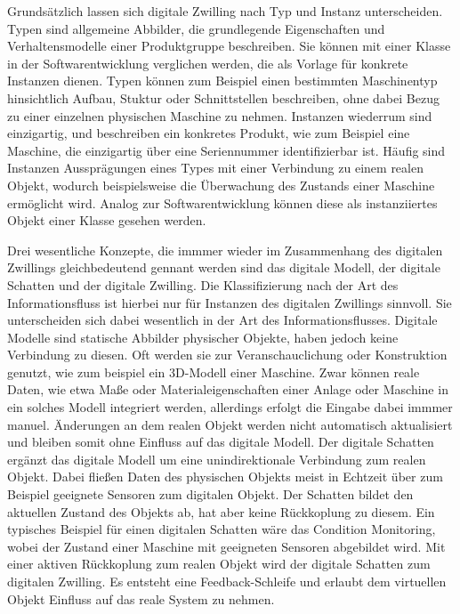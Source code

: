 Grundsätzlich lassen sich digitale Zwilling nach Typ und Instanz unterscheiden.
Typen sind allgemeine Abbilder, die grundlegende Eigenschaften und Verhaltensmodelle einer Produktgruppe beschreiben. 
Sie können mit einer Klasse in der Softwarentwicklung verglichen werden, die als Vorlage für konkrete Instanzen dienen.
Typen können zum Beispiel einen bestimmten Maschinentyp hinsichtlich Aufbau, Stuktur oder Schnittstellen beschreiben, ohne dabei Bezug zu einer einzelnen physischen Maschine zu nehmen.
Instanzen wiederrum sind einzigartig, und beschreiben ein konkretes Produkt, wie zum Beispiel eine Maschine, die einzigartig über eine Seriennummer identifizierbar ist.
Häufig sind Instanzen Aussprägungen eines Types mit einer Verbindung zu einem realen Objekt, wodurch beispielsweise die Überwachung des Zustands einer Maschine ermöglicht wird.
Analog zur Softwarentwicklung können diese als instanziiertes Objekt einer Klasse gesehen werden. \cite{ZEISS}

Drei wesentliche Konzepte, die immmer wieder im Zusammenhang des digitalen Zwillings gleichbedeutend gennant werden sind das digitale Modell, der digitale Schatten und der digitale Zwilling. \cite{KRITZINGER20181016}
Die Klassifizierung nach der Art des Informationsfluss ist hierbei nur für Instanzen des digitalen Zwillings sinnvoll.
Sie unterscheiden sich dabei wesentlich in der Art des Informationsflusses.
Digitale Modelle sind statische Abbilder physischer Objekte, haben jedoch keine Verbindung zu diesen. 
Oft werden sie zur Veranschauclichung oder Konstruktion genutzt, wie zum beispiel ein 3D-Modell einer Maschine.
Zwar können reale Daten, wie etwa Maße oder Materialeigenschaften einer Anlage oder Maschine in ein solches Modell integriert werden, allerdings erfolgt die Eingabe dabei immmer manuel.
Änderungen an dem realen Objekt werden nicht automatisch aktualisiert und bleiben somit ohne Einfluss auf das digitale Modell.
Der digitale Schatten ergänzt das digitale Modell um eine unindirektionale Verbindung zum realen Objekt.
Dabei fließen Daten des physischen Objekts meist in Echtzeit über zum Beispiel geeignete Sensoren zum digitalen Objekt.
Der Schatten bildet den aktuellen Zustand des Objekts ab, hat aber keine Rückkoplung zu diesem.
Ein typisches Beispiel für einen digitalen Schatten wäre das Condition Monitoring, wobei der Zustand einer Maschine mit geeigneten Sensoren abgebildet wird.
Mit einer aktiven Rückkoplung zum realen Objekt wird der digitale Schatten zum digitalen Zwilling.
Es entsteht eine Feedback-Schleife und erlaubt dem virtuellen Objekt Einfluss auf das reale System zu nehmen.


